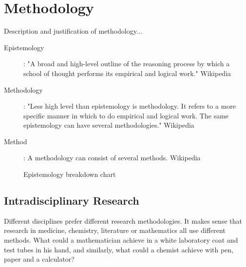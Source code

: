
\pagestyle{fancy}

\chapter{Methodology}


\begin{shaded}
  Description and justification of methodology...
\end{shaded}

\begin{description}
  \item [Epistemology]:	"A broad and high-level outline of the reasoning process by which a school of thought performs its empirical and logical work." Wikipedia
  \item [Methodology]: "Less high level than epistemology is methodology. It refers to a more specific manner in which to do empirical and logical work. The same epistemology can have several methodologies." Wikipedia
  \item [Method]:	A methodology can consist of several methods. Wikipedia
\end{description}

\begin{figure}
  \centering
  \caption[Epistemology]{Epistemology breakdown chart}
  \label{fig:method}
\end{figure}


\section{Intradisciplinary Research}

Different disciplines prefer different research methodologies. It makes sense that research in medicine, chemistry, literature or mathematics all use different methods. What could a mathematician achieve in a white laboratory coat and test tubes in his hand, and similarly, what could a chemist achieve with pen, paper and a calculator?

